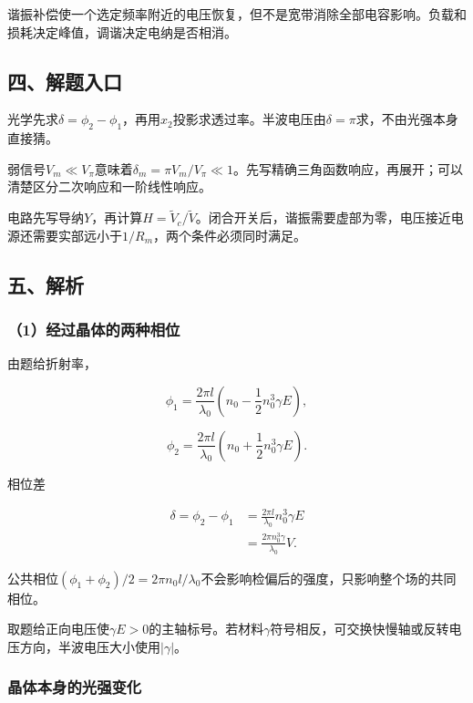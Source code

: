 \documentclass[12pt,a4paper,fontset=fandol]{ctexart}
\begin{document}
谐振补偿使一个选定频率附近的电压恢复，但不是宽带消除全部电容影响。负载和损耗决定峰值，调谐决定电纳是否相消。

\subsection{四、解题入口}\label{ux56dbux89e3ux9898ux5165ux53e3-7}

光学先求\(\delta=\phi_2-\phi_1\)，再用\(x_2\)投影求透过率。半波电压由\(\delta=\pi\)求，不由光强本身直接猜。

弱信号\(V_m\ll V_\pi\)意味着\(\delta_m=\pi V_m/V_\pi\ll1\)。先写精确三角函数响应，再展开；可以清楚区分二次响应和一阶线性响应。

电路先写导纳\(Y\)，再计算\(H=\widetilde V_c/\widetilde V\)。闭合开关后，谐振需要虚部为零，电压接近电源还需要实部远小于\(1/R_m\)，两个条件必须同时满足。

\subsection{五、解析}\label{ux4e94ux89e3ux6790-7}

\subsubsection{（1）经过晶体的两种相位}\label{ux7ecfux8fc7ux6676ux4f53ux7684ux4e24ux79cdux76f8ux4f4d}

由题给折射率，

\[
\phi_1=\frac{2\pi l}{\lambda_0}
\left(n_0-\frac12n_0^3\gamma E\right),
\]

\[
\phi_2=\frac{2\pi l}{\lambda_0}
\left(n_0+\frac12n_0^3\gamma E\right).
\]

相位差

\[
\begin{aligned}
\delta=\phi_2-\phi_1
&=\frac{2\pi l}{\lambda_0}n_0^3\gamma E\\
&=\boxed{\frac{2\pi n_0^3\gamma}{\lambda_0}V}.
\end{aligned}
\]

公共相位\((\phi_1+\phi_2)/2=2\pi n_0l/\lambda_0\)不会影响检偏后的强度，只影响整个场的共同相位。

取题给正向电压使\(\gamma E>0\)的主轴标号。若材料\(\gamma\)符号相反，可交换快慢轴或反转电压方向，半波电压大小使用\(|\gamma|\)。

\subsubsection{晶体本身的光强变化}\label{ux6676ux4f53ux672cux8eabux7684ux5149ux5f3aux53d8ux5316}
\end{document}
